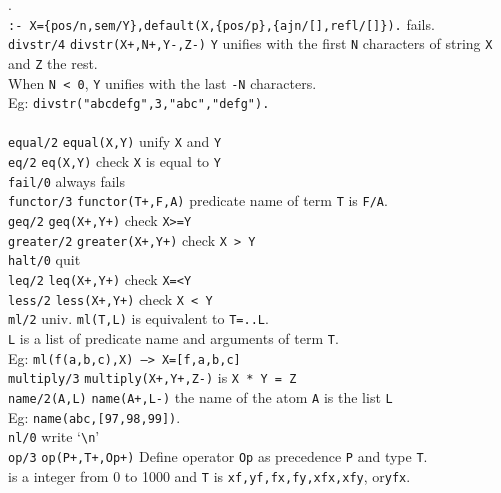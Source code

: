 \begin{tabbing}
	. \\
	\>\hspace{19pt} {\tt :- X=\{pos/n,sem/Y\},default(X,\{pos/p\},\{ajn/[],refl/[]\}).} 
	fails.\\
{\tt divstr/4} \> {\tt divstr(X+,N+,Y-,Z-)}
{\tt Y} unifies with the first {\tt N} characters of string {\tt X} and 
{\tt Z} the rest.\\
	\>When {\tt N < 0}, {\tt Y} unifies with the last {\tt -N} 
	characters. \\
	\> Eg: {\tt divstr("abcdefg",3,"abc","defg").}\\
	\> \hspace{19pt}{\tt divstr("abcdefg",-2,"abcde","fg").}\\
{\tt equal/2} \> {\tt equal(X,Y)} unify {\tt X} and {\tt Y}\\
{\tt eq/2} \> {\tt eq(X,Y)} check {\tt X} is equal to {\tt Y}\\
{\tt fail/0}  \> always fails \\
{\tt functor/3} \> {\tt functor(T+,F,A)} predicate name of term 
	{\tt T} is {\tt F/A}.\\
{\tt geq/2}	\> {\tt geq(X+,Y+)} check {\tt X>=Y}\\
{\tt greater/2} \> {\tt greater(X+,Y+)} check {\tt X > Y}\\
{\tt halt/0}	\> quit \cuprolog\\
{\tt leq/2}	\> {\tt leq(X+,Y+)} check {\tt X=<Y}\\
{\tt less/2} \> {\tt less(X+,Y+)} check {\tt X < Y}\\
{\tt ml/2}	\> univ. {\tt ml(T,L)} is equivalent to {\tt T=..L}.\\
	\> {\tt L} is a list of predicate name and arguments of term {\tt T}.\\
	\>Eg: {\tt ml(f(a,b,c),X) --> X=[f,a,b,c]}\\
{\tt multiply/3} \> {\tt multiply(X+,Y+,Z-)} is \verb$X * Y = Z$\\
{\tt name/2(A,L)} \> {\tt name(A+,L-)} the name of the atom {\tt A} is
the list {\tt L}\\
	\> Eg: {\tt name(abc,[97,98,99])}.\\
{\tt nl/0}	\> write `\verb+\n+' \\
{\tt op/3}	\> {\tt op(P+,T+,Op+)} Define operator {\tt Op} as
precedence {\tt P} and type {\tt T}.\\
	 is a integer from 0 to 1000 and  
{\tt T} is {\tt xf,yf,fx,fy,xfx,xfy}, or{\tt yfx}.\\

\end{tabbing}
